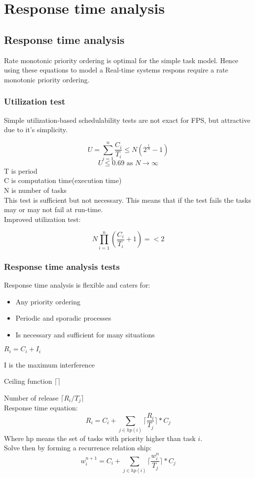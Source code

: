 \chapter{Response time analysis}
\section{Response time analysis}
Rate monotonic priority ordering is optimal for the simple task model. Hence using these equations to model a Real-time systems respons require a rate monotonic priority ordering.
\subsection{Utilization test}
Simple utilization-based schedulability tests are not exact
for FPS, but attractive due to it's simplicity.

$$ U = \sum\limits_{i=1}^n \frac{C_i}{T_i} \leq N(2^{\frac{1}{N}} - 1) $$
$$ U \leq 0.69 \text{ as } N \to \infty $$ %
\newline
T is period\\
C is computation time(execution time)\\
N is number of tasks\\
\newline This test is sufficient but not necessary. This means that if the test fails the tasks may or may not fail at run-time.\\
\newline Improved utilization test:

$$ N  \prod\limits_{i=1}^n (\frac{C_i}{T_i} + 1) =< 2 $$

\subsection{Response time analysis tests}
Response time analysis is flexible and caters for:
\begin{itemize}
\item 
Any priority ordering
\item 
Periodic and sporadic processes
\item 
Is necessary and sufficient for many situations
\end{itemize}


$R_i = C_i + I_i $

I is the maximum interference

Ceiling function $\lceil\rceil$

Number of release $\lceil R_i/T_j \rceil$ \\
Response time equation:
$$ R_i = C_i + \sum\limits_{j \in hp(i)} \lceil \frac{R_i}{T_j} \rceil * C_j $$
Where hp means the set of tasks with priority higher than task $i$.\\
Solve then by forming a recurrence relation ship:
$$ w_i^{n+1} = C_i + \sum\limits_{j \in hp(i)}\lceil \frac{w_i^n}{T_j}\rceil *C_j$$ \\

